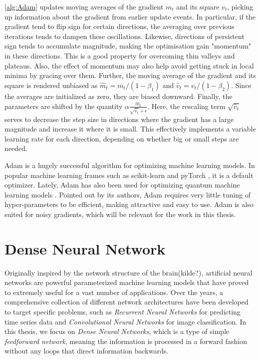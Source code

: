 \autoref{alg:Adam} updates moving averages of the gradient $m_t$ and its square $v_t$, picking up information about the gradient from earlier update events. In particular, if the gradient tend to flip sign for certain directions, the averaging over previous iterations tends to dampen these oscillations. Likewise, directions of persistent sign tends to accumulate magnitude, making the optimisation gain "momentum" in these directions. This is a good property for overcoming thin valleys and plateaus. Also, the effect of momentum may also help avoid getting stuck in local minima by gracing over them. Further, the moving average of the gradient and its square is rendered unbiased as $\hat{m}_t = m_t/(1-\beta_1)$ and $\hat{v}_t = v_t/(1-\beta_2)$. Since the averages are initialized as zero, they are biased downward. Finally, the parameters are shifted by the quantity $\alpha \frac{\hat{m}_t}{\sqrt{\hat{v}_t} + \epsilon}$. Here, the rescaling term $\sqrt{\hat{v}_t}$ serves to decrease the step size in directions where the gradient has a large magnitude and increase it where it is small. This effectively implements a variable learning rate for each direction, depending on whether big or small steps are needed. 

Adam is a hugely successful algorithm for optimizing machine learning models. In popular machine learning frames such as scikit-learn \cite{scikit-learn} and pyTorch \cite{NEURIPS2019_9015}, it is a default optimizer. Lately, Adam has also been used for optimizing quantum machine learning models \cite{abbas2020power} \cite{skolik2020layerwise}. Pointed out by its authors, Adam requires very little tuning of hyper-parameters to be efficient, making attractive and easy to use. Adam is also suited for noisy gradients, which will be relevant for the work in this thesis. 



\section{Dense Neural Network}\label{sec:DenseNeuralNetwork}
Originally inspired by the network structure of the brain(kilde?), artificial neural networks are powerful parameterized machine learning models that have proved to extremely useful for a vast number of applications. Over the years, a comprehensive collection of different network architectures have been developed to target specific problems, such as \emph{Recurrent Neural Networks} for predicting time series data and \emph{Convolutional Neural Networks} for image classification. In this thesis, we focus on \emph{Dense Neural Networks}, which is a type of simple \emph{feedforward network}, meaning the information is processed in a forward fashion without any loops that direct information backwards.

